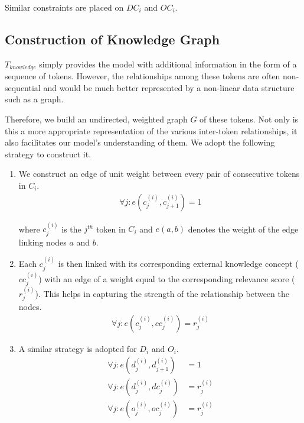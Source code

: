 Similar constraints are placed on $DC_i$ and $OC_i$.

\subsection{Construction of Knowledge Graph}
\label{sec:graph-construction}
$T_{knowledge}$ simply provides the model with additional information in the form of a sequence of tokens. However, the relationships among these tokens are often non-sequential and would be much better represented by a non-linear data structure such as a graph. 

Therefore, we build an undirected, weighted graph $G$ of these tokens. Not only is this a more appropriate representation of the various inter-token relationships, it also facilitates our model's understanding of them. We adopt the following strategy to construct it. 

\begin{enumerate}
    \item We construct an edge of unit weight between every pair of consecutive tokens in $C_i$. 
    \begin{equation}
      \label{eq:connect-input-caption}
      \begin{aligned}
        \forall j: e(c_j^{(i)}, c_{j+1}^{(i)}) = 1 
      \end{aligned}
    \end{equation}
    
    where $c_j^{(i)}$ is the $j^{th}$ token in $C_i$ and $e(a,b)$ denotes the weight of the edge linking nodes $a$ and $b$.
    \item Each $c_j^{(i)}$ is then linked with its corresponding external knowledge concept ($cc_j^{(i)}$) with an edge of a weight equal to the corresponding relevance score ($r_j^{(i)}$). This helps in capturing the strength of the relationship between the nodes.   
    \begin{equation}
      \label{eq:caption-concepts}
      \begin{aligned}
        \forall j: e(c_j^{(i)}, cc_j^{(i)}) = r_j^{(i)}
      \end{aligned}
    \end{equation}
    
    \item A similar strategy is adopted for $D_i$ and $O_i$.
    \begin{equation}
      \label{eq:image-caption-connections}
      \begin{aligned}
        \forall j: e(d_j^{(i)}, d_{j+1}^{(i)}) & = 1 \\
        \forall j: e(d_j^{(i)}, dc_j^{(i)}) &  = r_j^{(i)} \\
        \forall j: e(o_j^{(i)}, oc_j^{(i)}) & = r_j^{(i)}
      \end{aligned}
    \end{equation}
    
 \end{enumerate}   

